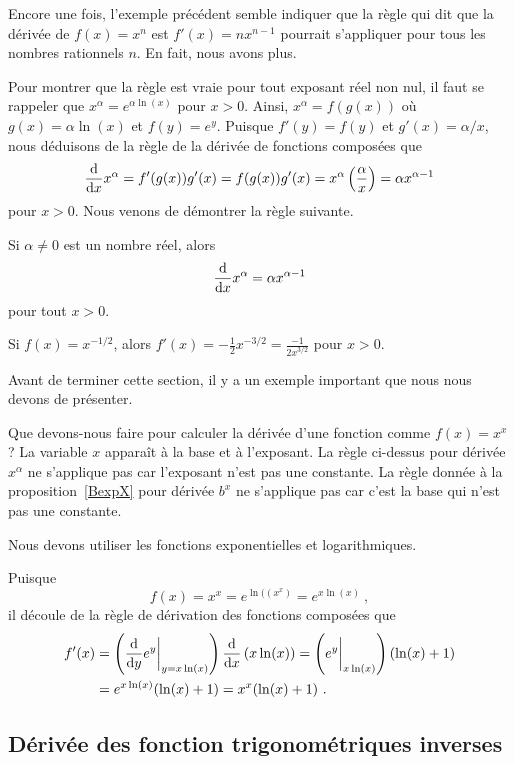 {Encore une fois, l'exemple précédent semble indiquer que la règle qui
dit que la dérivée de $f(x) = x^n$ est $f'(x) = nx^{n-1}$ pourrait
s'appliquer pour tous les nombres rationnels $n$.  En fait,
nous avons plus.

Pour montrer que la règle est vraie pour tout exposant réel non nul,
il faut se rappeler que $\displaystyle x^\alpha = e^{\alpha \ln(x)}$
pour $x>0$.  Ainsi, $x^\alpha = f(g(x))$ où $g(x) = \alpha \ln(x)$ et
$f(y) = e^y$.   Puisque $f'(y) = f(y)$ et $g'(x) = \alpha / x$,
nous déduisons de la règle de la dérivée de fonctions composées que
\[
\dfdx{x^\alpha}{x} = f'(g(x)) g'(x)
= f(g(x)) g'(x) = x^{\alpha} \left(\frac{\alpha}{x}\right)
= \alpha x^{\alpha-1}
\]
pour $x>0$.  Nous venons de démontrer la règle suivante.

\begin{focus}{\prp}
Si $\alpha \neq 0$ est un nombre réel, alors
\[
\dfdx{x^\alpha}{x} = \alpha x^{\alpha-1}
\]
pour tout $x>0$.
\end{focus}

\begin{egg}
Si $f(x) = x^{-1/2}$, alors
$\displaystyle f'(x) = -\frac{1}{2} x^{-3/2} = \frac{-1}{2 x^{3/2}}$
pour $x>0$.
\end{egg}

Avant de terminer cette section, il y a un exemple important que nous
nous devons de présenter.

\begin{egg}
Que devons-nous faire pour calculer la dérivée d'une fonction comme
$f(x) = x^x$?  La variable $x$ apparaît à la base et à l'exposant.
La règle ci-dessus pour dérivée $x^\alpha$ ne s'applique pas car
l'exposant n'est pas une constante.  La règle donnée à la
proposition~\ref{BexpX} pour dérivée $b^x$ ne s'applique pas car
c'est la base qui n'est pas une constante.

Nous devons utiliser les fonctions exponentielles et logarithmiques.

Puisque
\[
f(x) = x^x = e^{\ln((x^x)}  = e^{x\ln(x)} \ ,
\]
il découle de la règle de dérivation des fonctions composées que
\begin{align*}
f'(x) &= \left(\dfdx{e^y}{y} \bigg|_{y=x\ln(x)} \right)
\dfdx{\left( x\ln(x)\right)}{x}
= \left( e^y \bigg|_{x\ln(x)} \right) ( \ln(x) + 1 ) \\
&= e^{x\ln(x)} ( \ln(x) + 1)
= x^x( \ln(x) + 1) \ .
\end{align*}
\end{egg}

\subsection{Dérivée des fonction trigonométriques inverses \life \eng}

}
